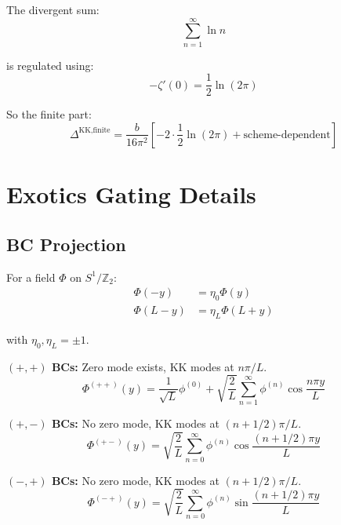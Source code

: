 \documentclass[11pt,a4paper]{article}
\begin{document}
The divergent sum:
\begin{equation}
\label{eq:ln-sum}
\sum_{n=1}^{\infty}\ln n
\end{equation}

is regulated using:
\begin{equation}
\label{eq:zeta-prime}
-\zeta'(0) = \frac{1}{2}\ln(2\pi)
\end{equation}

So the finite part:
\begin{equation}
\label{eq:finite-kk}
\Delta^{\text{KK,finite}} = \frac{b}{16\pi^2}\left[-2\cdot\frac{1}{2}\ln(2\pi) + \text{scheme-dependent}\right]
\end{equation}

\section{Exotics Gating Details}
\label{app:exotics-app}

\subsection{BC Projection}
\label{app:bc-projection}

For a field $\Phi$ on $S^1/\mathbb{Z}_2$:
\begin{align}
\label{eq:bc-z2-0}
\Phi(-y) &= \eta_0 \Phi(y) \\
\label{eq:bc-z2-L}
\Phi(L-y) &= \eta_L \Phi(L+y)
\end{align}

with $\eta_0, \eta_L = \pm 1$.

\textbf{$(+,+)$ BCs:} Zero mode exists, KK modes at $n\pi/L$.
\begin{equation}
\label{eq:pp-bc}
\Phi^{(++)}(y) = \frac{1}{\sqrt{L}}\phi^{(0)} + \sqrt{\frac{2}{L}}\sum_{n=1}^{\infty}\phi^{(n)}\cos\frac{n\pi y}{L}
\end{equation}

\textbf{$(+,-)$ BCs:} No zero mode, KK modes at $(n+1/2)\pi/L$.
\begin{equation}
\label{eq:pm-bc}
\Phi^{(+-)}(y) = \sqrt{\frac{2}{L}}\sum_{n=0}^{\infty}\phi^{(n)}\cos\frac{(n+1/2)\pi y}{L}
\end{equation}

\textbf{$(-,+)$ BCs:} No zero mode, KK modes at $(n+1/2)\pi/L$.
\begin{equation}
\label{eq:mp-bc}
\Phi^{(-+)}(y) = \sqrt{\frac{2}{L}}\sum_{n=0}^{\infty}\phi^{(n)}\sin\frac{(n+1/2)\pi y}{L}
\end{equation}
\end{document}
